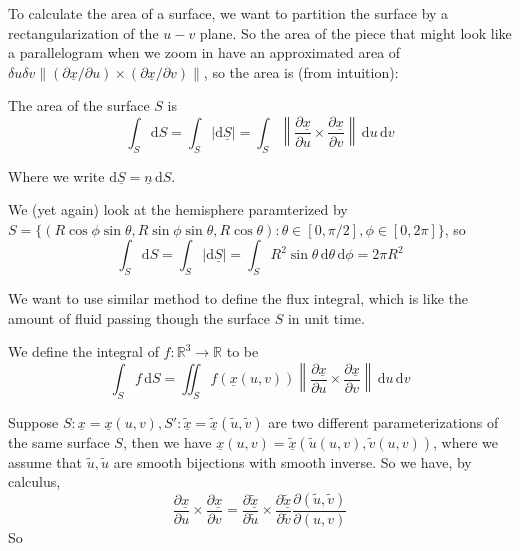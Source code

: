 To calculate the area of a surface, we want to partition the surface by a rectangularization of the $u-v$ plane.
So the area of the piece that might look like a parallelogram when we zoom in have an approximated area of $\delta u\delta v\|(\partial \underline{x}/\partial u)\times(\partial \underline{x}/\partial v)\|$, so the area is (from intuition):
\begin{definition}
    The area of the surface $S$ is
    $$\int_S\mathrm dS=\int_S|\mathrm d\underline{S}|=\int_S\left\|\frac{\partial\underline{x}}{\partial u}\times\frac{\partial\underline{x}}{\partial v}\right\|\,\mathrm du\,\mathrm dv$$
\end{definition}
Where we write $\mathrm d\underline{S}=\underline{n}\,\mathrm dS$.
\begin{example}
    We (yet again) look at the hemisphere paramterized by $S=\{(R\cos\phi\sin\theta,R\sin\phi\sin\theta,R\cos\theta):\theta\in[0,\pi/2],\phi\in[0,2\pi]\}$, so
    $$\int_S\mathrm dS=\int_S|\mathrm d\underline{S}|=\int_SR^2\sin\theta\,\mathrm d\theta\,\mathrm d\phi=2\pi R^2$$
\end{example}
We want to use similar method to define the flux integral, which is like the amount of fluid passing though the surface $S$ in unit time.
\begin{definition}
    We define the integral of $f:\mathbb R^3\to\mathbb R$ to be
    $$\int_Sf\,\mathrm dS=\iint_Sf(\underline{x}(u,v))\left\|\frac{\partial\underline{x}}{\partial u}\times\frac{\partial\underline{x}}{\partial v}\right\|\,\mathrm du\,\mathrm dv$$
\end{definition}
Suppose $S:\underline{x}=\underline{x}(u,v),S':\underline{\tilde{x}}=\underline{\tilde{x}}(\tilde{u},\tilde{v})$ are two different parameterizations of the same surface $S$, then we have $\underline{x}(u,v)=\underline{\tilde{x}}(\tilde{u}(u,v),\tilde{v}(u,v))$, where we assume that $\tilde{u},\tilde{u}$ are smooth bijections with smooth inverse.
So we have, by calculus,
$$\frac{\partial\underline{x}}{\partial u}\times\frac{\partial\underline{x}}{\partial v}=\frac{\partial\underline{\tilde{x}}}{\partial\tilde{u}}\times\frac{\partial\underline{\tilde{x}}}{\partial\tilde{v}}\frac{\partial (\tilde{u},\tilde{v})}{\partial (u,v)}$$
So
